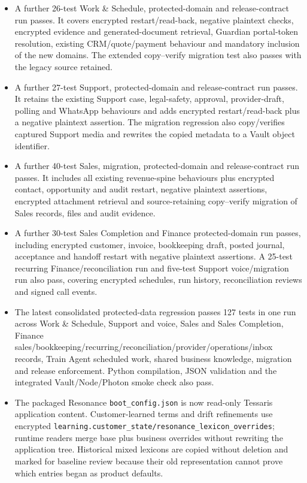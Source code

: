 \documentclass[11pt]{article}
\newcommand{\code}[1]{\texttt{#1}}
\begin{document}
\begin{itemize}
  \item A further 26-test Work \& Schedule, protected-domain and release-contract run passes. It covers encrypted restart/read-back, negative plaintext checks, encrypted evidence and generated-document retrieval, Guardian portal-token resolution, existing CRM/quote/payment behaviour and mandatory inclusion of the new domains. The extended copy--verify migration test also passes with the legacy source retained.
  \item A further 27-test Support, protected-domain and release-contract run passes. It retains the existing Support case, legal-safety, approval, provider-draft, polling and WhatsApp behaviours and adds encrypted restart/read-back plus a negative plaintext assertion. The migration regression also copy/verifies captured Support media and rewrites the copied metadata to a Vault object identifier.
  \item A further 40-test Sales, migration, protected-domain and release-contract run passes. It includes all existing revenue-spine behaviours plus encrypted contact, opportunity and audit restart, negative plaintext assertions, encrypted attachment retrieval and source-retaining copy--verify migration of Sales records, files and audit evidence.
  \item A further 30-test Sales Completion and Finance protected-domain run passes, including encrypted customer, invoice, bookkeeping draft, posted journal, acceptance and handoff restart with negative plaintext assertions. A 25-test recurring Finance/reconciliation run and five-test Support voice/migration run also pass, covering encrypted schedules, run history, reconciliation reviews and signed call events.
  \item The latest consolidated protected-data regression passes 127 tests in one run across Work \& Schedule, Support and voice, Sales and Sales Completion, Finance sales/bookkeeping/recurring/reconciliation/provider/operations/inbox records, Train Agent scheduled work, shared business knowledge, migration and release enforcement. Python compilation, JSON validation and the integrated Vault/Node/Photon smoke check also pass.
  \item The packaged Resonance \code{boot\_config.json} is now read-only Tessaris application content. Customer-learned terms and drift refinements use encrypted \code{learning.customer\_state/resonance\_lexicon\_overrides}; runtime readers merge base plus business overrides without rewriting the application tree. Historical mixed lexicons are copied without deletion and marked for baseline review because their old representation cannot prove which entries began as product defaults.

\end{itemize}
\end{document}
